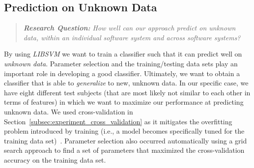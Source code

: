 \subsection{Prediction on Unknown Data}
\label{subsec:experiment_prediction}
\begin{quote}
  \emph{\textbf{Research Question:} How well can our approach predict on unknown data, within an individual software system and across software systems?}
\end{quote}

\noindent
By using \emph{LIBSVM} we want to train a classifier such that it can predict well on \emph{unknown data}. Parameter selection and the training/testing data sets play an important role in developing a good classifier. Ultimately, we want to obtain a classifier that is able to \emph{generalize} to new, unknown data. In our specific case, we have eight different test subjects (that are most likely not similar to each other in terms of features) in which we want to maximize our performance at predicting unknown data. We used cross-validation in Section~\ref{subsec:experiment_cross_validation} as it mitigates the overfitting problem introduced by training (i.e., a model becomes specifically tuned for the training data set)~\cite{HCL03}. Parameter selection also occurred automatically using a grid search approach to find a set of parameters that maximized the cross-validation accuracy on the training data set.

